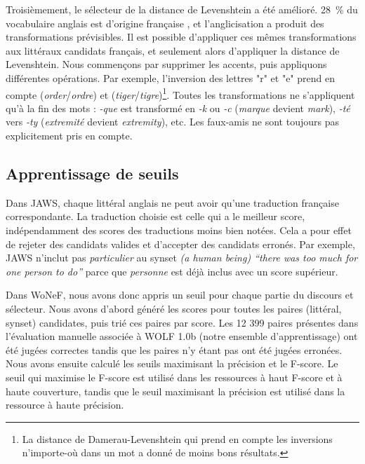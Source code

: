 Troisièmement, le sélecteur de la distance de Levenshtein a été amélioré. 28~\%
du vocabulaire anglais est d'origine française \citep{finkenstaedt1973ordered},
et l'anglicisation a produit des transformations prévisibles. Il est possible
d'appliquer ces mêmes transformations aux littéraux candidats français, et
seulement alors d'appliquer la distance de Levenshtein. Nous commençons par
supprimer les accents, puis appliquons différentes opérations. Par exemple,
l'inversion des lettres "r" et "e" prend en compte
(\textit{order}/\textit{ordre}) et (\textit{tiger}/\textit{tigre})\footnote{La
distance de Damerau-Levenshtein qui prend en compte les inversions n'importe-où
dans un mot \citep{damerau1964technique} a donné de moins bons résultats.}.
Toutes les transformations ne s'appliquent qu'à la fin des mots : \textit{-que}
est transformé en \textit{-k} ou \textit{-c} (\textit{marque} devient
\textit{mark}), \textit{-té} vers \textit{-ty} (\textit{extremité} devient
\textit{extremity}), etc. Les faux-amis ne sont toujours pas explicitement pris
en compte.

\subsection{Apprentissage de seuils}
\label{subsec:learning_thresholds}

Dans JAWS, chaque littéral anglais ne peut avoir qu'une traduction française
correspondante. La traduction choisie est celle qui a le meilleur score,
indépendamment des scores des traductions moins bien notées. Cela a pour effet
de rejeter des candidats valides et d'accepter des candidats erronés. Par
exemple, JAWS n'inclut pas \textit{particulier} au synset \textit{(a human
being) ``there was too much for one person to do''} parce que \textit{personne}
est déjà inclus avec un score supérieur.

Dans WoNeF, nous avons donc appris un seuil pour chaque partie du discours et
sélecteur. Nous avons d'abord généré les scores pour toutes les paires
(littéral, synset) candidates, puis trié ces paires par score. Les 12 399
paires présentes dans l'évaluation manuelle associée à WOLF 1.0b (notre
ensemble d'apprentissage) ont été jugées correctes tandis que les paires n'y
étant pas ont été jugées erronées. Nous avons ensuite calculé les seuils
maximisant la précision et le F-score. Le seuil qui maximise le F-score est
utilisé dans les ressources à haut F-score et à haute couverture, tandis que le
seuil maximisant la précision est utilisé dans la ressource à haute précision.

